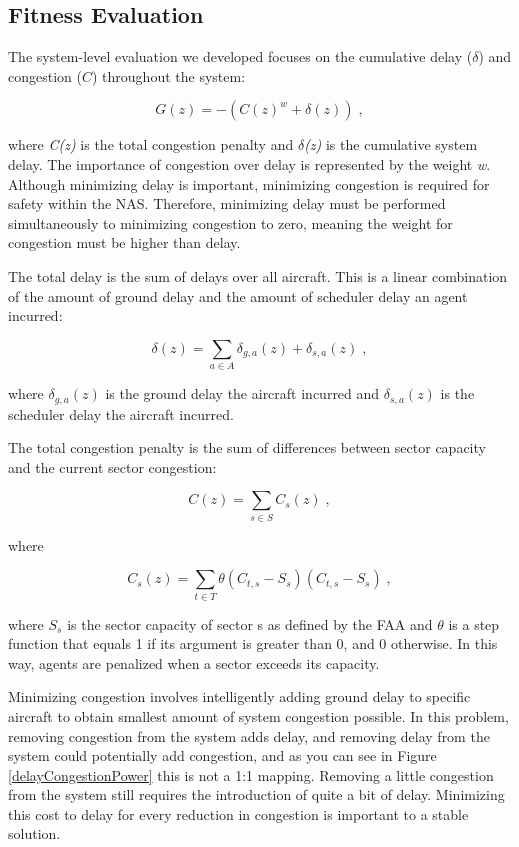 \documentclass{sig-alternate}
\begin{document}
\subsection{Fitness Evaluation}
The system-level evaluation we developed focuses on the cumulative delay ($\delta$) and congestion ($C$) throughout the system:

\begin{equation}
G(z) = -(C(z)^w + \delta(z))\;,
\end{equation}

where \textit{C(z)} is the total congestion penalty and \textit{$\delta$(z)} is the cumulative system delay. The importance of congestion over delay is represented by the weight \textit{w}. Although minimizing delay is important, minimizing congestion is required for safety within the NAS. Therefore, minimizing delay must be performed simultaneously to minimizing congestion to zero, meaning the weight for congestion must be higher than delay.

The total delay is the sum of delays over all aircraft. This is a linear combination of the amount of ground delay and the amount of scheduler delay an agent incurred:

\begin{equation}
\delta(z) = \displaystyle\sum\limits_{a \in A} \delta_{g,a}(z) + \delta_{s,a}(z)\;,
\end{equation}

where $\delta_{g,a}(z)$ is the ground delay the aircraft incurred and $\delta_{s,a}(z)$ is the scheduler delay the aircraft incurred. 

The total congestion penalty is the sum of differences between sector capacity and the current sector congestion:

\begin{equation}
C(z) = \displaystyle\sum\limits_{s \in S} C_s(z)\;,
\end{equation}

where

\begin{equation}
C_s(z) = \displaystyle\sum\limits_{t \in T} \theta(C_{t,s} - S_s) (C_{t,s} - S_s)\;,
\end{equation}

where $S_s$ is the sector capacity of sector s as defined by the FAA and $\theta$ is a step function that equals 1 if its argument is greater than 0, and 0 otherwise. In this way, agents are penalized when a sector exceeds its capacity.

Minimizing congestion involves intelligently adding ground delay to specific aircraft to obtain smallest amount of system congestion possible. In this problem, removing congestion from the system adds delay, and removing delay from the system could potentially add congestion, and as you can see in Figure \ref{delayCongestionPower} this is not a 1:1 mapping. Removing a little congestion from the system still requires the introduction of quite a bit of delay. Minimizing this cost to delay for every reduction in congestion is important to a stable solution.
\end{document}
